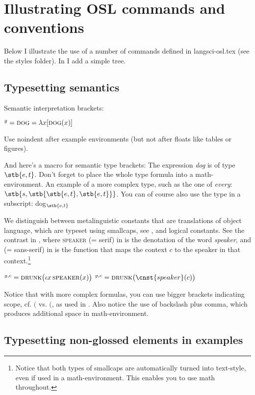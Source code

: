 \section{Illustrating OSL commands and conventions}

Below I illustrate the use of a number of commands defined in langsci-osl.tex (see the styles folder). In  I add a simple tree.

\subsection{Typesetting semantics}

Semantic interpretation brackets:

\ea {}$^g=\textsc{dog}=\lambda x[\textsc{dog}(x)]$\label{ex:dog}
\z

\noindent Use noindent after example environments (but not after floats like tables or figures).

And here's a macro for semantic type brackets: The expression \textit{dog} is of type $\stb{e,t}$. Don't forget to place the whole type formula into a math-environment. An example of a more complex type, such as the one of \textit{every}: $\stb{s,\stb{\stb{e,t},\stb{e,t}}}$. You can of course also use the type in a subscript: dog$_{\stb{e,t}}$

We distinguish between metalinguistic constants that are translations of object language, which are typeset using smallcaps, see , and logical constants. See the contrast in , where \textsc{speaker} (= serif) in  is the denotation of the word \textit{speaker}, and  (= sans-serif) in  is the function that maps the context $c$ to the speaker in that context.\footnote{Notice that both types of smallcaps are automatically turned into text-style, even if used in a math-environment. This enables you to use math throughout.}

\ea\label{ex:speaker}
\ea {}$^{g,c}=\textsc{drunk}\big(\iota x\,\textsc{speaker}(x)\big)$\label{ex:speaker-a}
\ex {}$^{g,c}=\textsc{drunk}\big(\cnst{speaker}(c)\big)$\label{ex:speaker-b}
\z\z

\noindent Notice that with more complex formulas, you can use bigger brackets indicating scope, cf. $($ vs. $\big($, as used in . Also notice the use of backslash plus comma, which produces additional space in math-environment.

\subsection{Typesetting non-glossed elements in examples}

